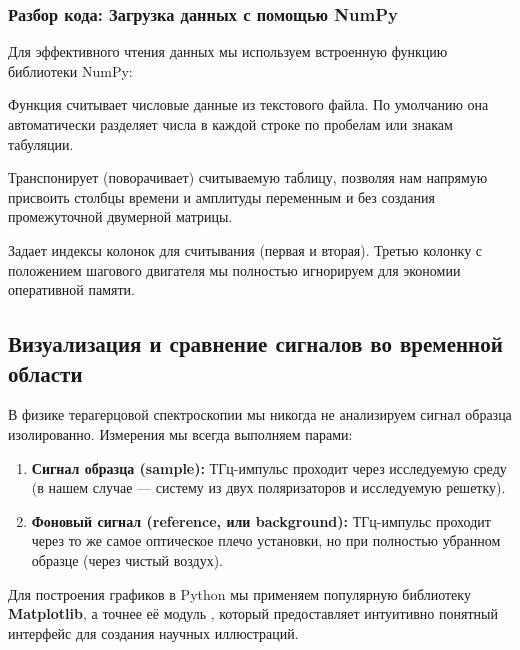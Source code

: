 \subsubsection{Разбор кода: Загрузка данных с помощью NumPy}

Для эффективного чтения данных мы используем встроенную функцию библиотеки NumPy:

\begin{syntaxdesc}
    \item[Загрузка файла \mycode{np.loadtxt(filepath, ...)} (строка 8)] Функция считывает числовые данные из текстового файла. По умолчанию она автоматически разделяет числа в каждой строке по пробелам или знакам табуляции.
    \item[Параметр распаковки \mycode{unpack=True} (строка 8)] Транспонирует (поворачивает) считываемую таблицу, позволяя нам напрямую присвоить столбцы времени и амплитуды переменным  и  без создания промежуточной двумерной матрицы.
    \item[Выбор колонок \mycode{usecols=(0, 1)} (строка 8)] Задает индексы колонок для считывания (первая и вторая). Третью колонку с положением шагового двигателя мы полностью игнорируем для экономии оперативной памяти.
\end{syntaxdesc}

\subsection{Визуализация и сравнение сигналов во временной области}

В физике терагерцовой спектроскопии мы никогда не анализируем сигнал образца изолированно. Измерения мы всегда выполняем парами:
\begin{enumerate}
    \item \textbf{Сигнал образца (sample):} ТГц-импульс проходит через исследуемую среду (в нашем случае — систему из двух поляризаторов и исследуемую решетку).
    \item \textbf{Фоновый сигнал (reference, или background):} ТГц-импульс проходит через то же самое оптическое плечо установки, но при полностью убранном образце (через чистый воздух).
\end{enumerate}

Для построения графиков в Python мы применяем популярную библиотеку \textbf{Matplotlib}, а точнее её модуль , который предоставляет интуитивно понятный интерфейс для создания научных иллюстраций.


